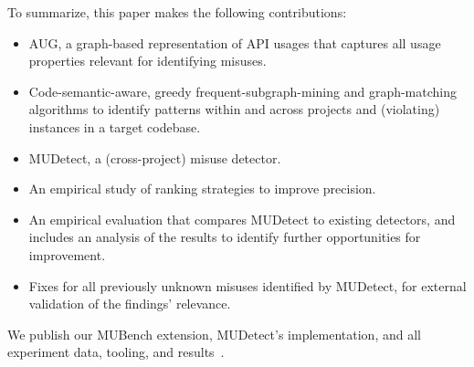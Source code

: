 
To summarize, this paper makes the following contributions:
%
\begin{itemize}[leftmargin=*]
  \item AUG, a graph-based representation of API usages that captures all usage properties relevant for identifying misuses. 
  \item Code-semantic-aware, greedy frequent-subgraph-mining and graph-matching algorithms to identify patterns within and across projects and (violating) instances in a target codebase.
  \item MUDetect, a (cross-project) misuse detector.
  \item An empirical study of ranking strategies to improve precision.
  \item An empirical evaluation that compares MUDetect to existing detectors, and includes an analysis of the results to identify further opportunities for improvement.
  \item Fixes for all previously unknown misuses identified by MUDetect, for external validation of the findings' relevance.
\end{itemize}

We publish our MUBench extension, MUDetect's implementation, and all experiment data, tooling, and results~\cite{artifact-page}.

